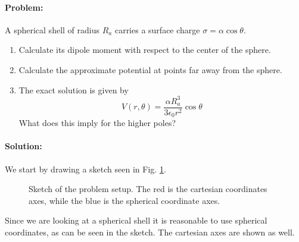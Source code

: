 \paragraph{Problem:} A spherical shell of radius $R_a$ carries a surface charge $\sigma = \alpha \cos\theta$.
\begin{enumerate}[label=(\alph*)]
    \item Calculate its dipole moment with respect to the center of the sphere.
    \item Calculate the approximate potential at points far away from the sphere.
    \item The exact solution is given by
            \begin{equation}
                V(r,\theta) = \frac{\alpha R_a^3}{3\epsilon_0 r^2} \cos\theta
            \end{equation}
            What does this imply for the higher poles?
\end{enumerate}

\paragraph{Solution:} We start by drawing a sketch seen in Fig. \ref{fig:sketch}.

\begin{figure}[H]
    \centering\hspace*{2.3cm}
    
    \caption{Sketch of the problem setup. The red is the cartesian coordinates axes, while the blue is the spherical coordinate axes.}
    \label{fig:sketch}
\end{figure}

Since we are looking at a spherical shell it is reasonable to use spherical coordinates, as can be seen in the sketch. The cartesian axes are shown as well. 

